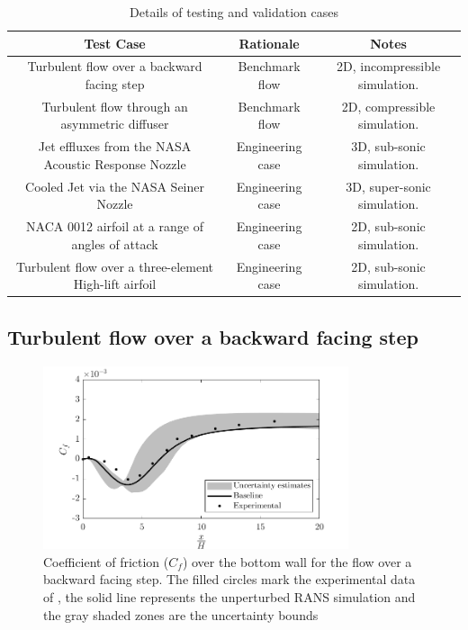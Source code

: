 \begin{table}
\caption{\label{tab:vandv_cases} Details of testing and validation cases}
\begin{center}
\begin{tabular}{ccc}
Test Case& Rationale& Notes \\\hline
Turbulent flow over a backward facing step& Benchmark flow& 2D, incompressible simulation.\\
Turbulent flow through an asymmetric diffuser& Benchmark flow& 2D, compressible simulation.\\
Jet effluxes from the NASA Acoustic Response Nozzle& Engineering case & 3D, sub-sonic simulation.\\
Cooled Jet via the NASA Seiner Nozzle& Engineering case& 3D, super-sonic simulation.\\
NACA 0012 airfoil at a range of angles of attack& Engineering case& 2D, sub-sonic simulation.\\
Turbulent flow over a three-element High-lift airfoil& Engineering case& 2D, sub-sonic simulation.\\
\end{tabular}
\end{center}
\end{table}

\subsection{Turbulent flow over a backward facing step}



\begin{figure}
\centering
\includegraphics[width=0.8\textwidth]{code/image_gen/backstep/images/backstep_cf_bot.png}
\caption{Coefficient of friction ($C_f$) over the bottom wall for the flow over a backward facing step. The filled circles mark the experimental data of \cite{driver1985}, the solid line represents the unperturbed RANS simulation and the gray shaded zones are the uncertainty bounds\label{fig:backstep_cf}}
\end{figure}

